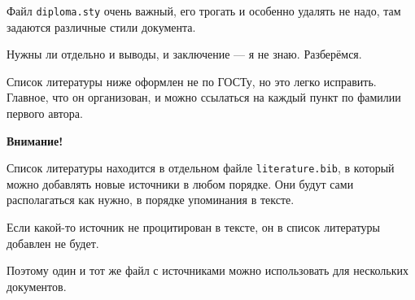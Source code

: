 \documentclass[a4paper,14pt]{extarticle}
\begin{document}
Файл \verb|diploma.sty| очень важный, его трогать и особенно удалять не надо, там задаются различные стили документа.

Нужны ли отдельно и выводы, и заключение --- я не знаю. Разберёмся.

Список литературы ниже оформлен не по ГОСТу, но это легко исправить. Главное, что он организован, и можно ссылаться на каждый пункт по фамилии первого автора.

\textbf{Внимание!} 

Список литературы находится в отдельном файле \verb|literature.bib|, в который можно добавлять новые источники в любом порядке. Они будут сами располагаться как нужно, в порядке упоминания в тексте.

Если какой-то источник не процитирован в тексте, он в список литературы добавлен не будет.

Поэтому один и тот же файл с источниками можно использовать для нескольких документов.

\printbibliography
\end{document}
